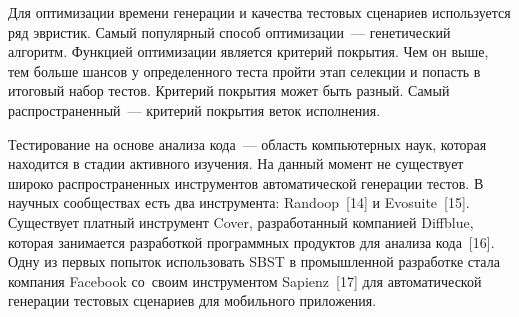 Для оптимизации времени генерации и качества тестовых сценариев используется ряд эвристик. Самый популярный способ оптимизации~--- генетический алгоритм. Функцией оптимизации является критерий покрытия. Чем он выше, тем больше шансов у определенного теста пройти этап селекции и попасть в итоговый набор тестов. Критерий покрытия может быть разный. Самый распространенный~--- критерий покрытия веток исполнения. 

Тестирование на основе анализа кода~--- область компьютерных наук, которая находится в стадии активного изучения. На данный момент не существует широко распространенных инструментов автоматической генерации тестов. В научных сообществах есть два инструмента: Randoop~[14] и Evosuite~[15]. Существует платный инструмент Cover, разработанный компанией Diffblue, которая занимается разработкой программных продуктов для анализа кода~[16].  Одну из первых попыток использовать SBST в промышленной разработке стала компания Facebook со~своим инструментом Sapienz~[17] для автоматической генерации тестовых сценариев для мобильного приложения. 

